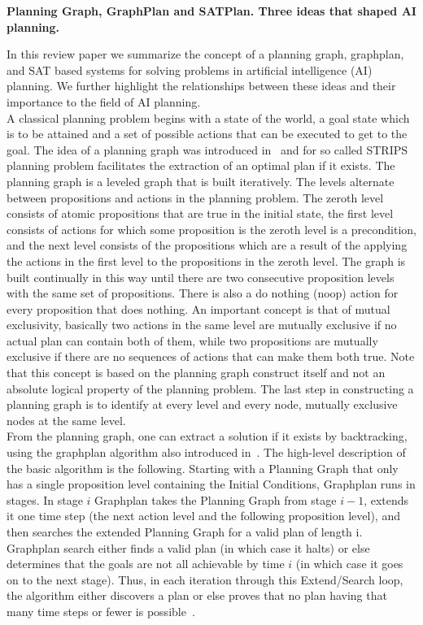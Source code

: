 \documentclass[11pt]{article}
\begin{document}
\begin{center}
{\bf Planning Graph, GraphPlan and SATPlan. Three ideas that shaped AI planning. }
\end{center}

In this review paper we summarize the concept of a planning graph, graphplan,  and SAT based systems for solving problems in artificial intelligence (AI) planning. We further highlight the relationships between these ideas and their importance to the field of AI planning.\\

A classical planning problem begins with a state of the world, a goal state which is to be attained and a set of possible actions that can be executed to get to the goal.  The idea of a planning graph was introduced in~\cite{Blum and Furst 1997} and for so called STRIPS planning problem facilitates the extraction of an optimal plan if it exists. The planning graph is a leveled graph that is built iteratively. The levels alternate between propositions and actions in the planning problem. The zeroth level consists of atomic propositions that are true in the initial state, the first level consists of actions for which some proposition is the zeroth level is a precondition, and the next level consists of the propositions which are a result of the applying the actions in the first level to the propositions in the zeroth level. The graph is built continually in this way  until there are two consecutive proposition levels with the same set of propositions. There is also a do nothing (noop) action for every proposition that does nothing. An important concept is that of mutual exclusivity, basically two actions in the same level are mutually exclusive if no actual plan can contain both of them, while two propositions are mutually exclusive if there are no sequences of actions that can make them both true. Note that this concept is based on the planning graph construct itself and not an absolute logical property of the planning problem. The last step in constructing a planning graph is to identify at every level and every node, mutually exclusive nodes at the same level.\\


From the planning graph, one can extract a solution if it exists by backtracking, using the graphplan algorithm also introduced in~\cite{Blum and Furst 1997}. The high-level description of the basic algorithm is the following. Starting with a Planning Graph that only has a single proposition level containing the Initial Conditions, Graphplan runs in stages. In stage $i$ Graphplan takes the Planning Graph from stage $i - 1$, extends it one time step (the next action level and the following proposition level), and then searches the extended Planning Graph for a valid plan of length i. Graphplan search either finds a valid plan (in which case it halts) or else determines that the goals are not all achievable by time $i$ (in which case it goes on to the next stage). Thus, in each iteration through this Extend/Search loop, the algorithm either discovers a plan or else proves that no plan having that many time steps or fewer is possible~\cite{Blum and Furst 1997}.\\
\end{document}
